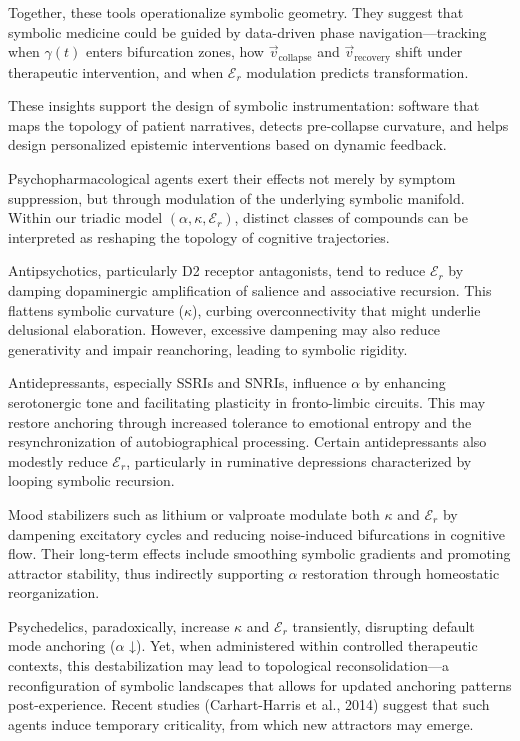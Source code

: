 Together, these tools operationalize symbolic geometry. They suggest that symbolic medicine could be guided by data-driven phase navigation—tracking when $\gamma(t)$ enters bifurcation zones, how $\vec{v}_{\text{collapse}}$ and $\vec{v}_{\text{recovery}}$ shift under therapeutic intervention, and when $\mathcal{E}_r$ modulation predicts transformation.

These insights support the design of symbolic instrumentation: software that maps the topology of patient narratives, detects pre-collapse curvature, and helps design personalized epistemic interventions based on dynamic feedback.

Psychopharmacological agents exert their effects not merely by symptom suppression, but through modulation of the underlying symbolic manifold. Within our triadic model $(\alpha, \kappa, \mathcal{E}_r)$, distinct classes of compounds can be interpreted as reshaping the topology of cognitive trajectories.

Antipsychotics, particularly D2 receptor antagonists, tend to reduce $\mathcal{E}_r$ by damping dopaminergic amplification of salience and associative recursion. This flattens symbolic curvature ($\kappa$), curbing overconnectivity that might underlie delusional elaboration. However, excessive dampening may also reduce generativity and impair reanchoring, leading to symbolic rigidity.

Antidepressants, especially SSRIs and SNRIs, influence $\alpha$ by enhancing serotonergic tone and facilitating plasticity in fronto-limbic circuits. This may restore anchoring through increased tolerance to emotional entropy and the resynchronization of autobiographical processing. Certain antidepressants also modestly reduce $\mathcal{E}_r$, particularly in ruminative depressions characterized by looping symbolic recursion.

Mood stabilizers such as lithium or valproate modulate both $\kappa$ and $\mathcal{E}_r$ by dampening excitatory cycles and reducing noise-induced bifurcations in cognitive flow. Their long-term effects include smoothing symbolic gradients and promoting attractor stability, thus indirectly supporting $\alpha$ restoration through homeostatic reorganization.

Psychedelics, paradoxically, increase $\kappa$ and $\mathcal{E}_r$ transiently, disrupting default mode anchoring ($\alpha$ ↓). Yet, when administered within controlled therapeutic contexts, this destabilization may lead to topological reconsolidation—a reconfiguration of symbolic landscapes that allows for updated anchoring patterns post-experience. Recent studies (Carhart-Harris et al., 2014\cite{CarhartHarris2014}) suggest that such agents induce temporary criticality, from which new attractors may emerge.

